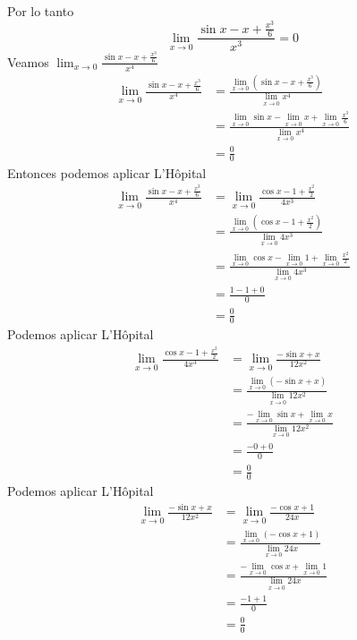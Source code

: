 \documentclass[a4paper]{article}
\begin{document}
Por lo tanto
\[
    \boxed{\boxed{ \lim_{x \to 0} \frac{\sin{x} - x + \frac{x^3}{6}}{x^3} = 0 }}
\]
Veamos \(\displaystyle \lim_{x \to 0} \frac{\sin{x} - x + \frac{x^3}{6}}{x^4}\)
\begin{align*}
    \lim_{x \to 0} \frac{\sin{x} - x + \frac{x^3}{6}}{x^4} &= \frac{\displaystyle{\lim_{x \to 0}} \left(\sin{x} - x + \frac{x^3}{6}\right)}{\displaystyle{\lim_{x \to 0}}x^4} \\
    &= \frac{\displaystyle{\lim_{x \to 0}} \sin{x} - \displaystyle{\lim_{x \to 0}} x + \displaystyle{\lim_{x \to 0}}\frac{x^3}{6}}{\displaystyle{\lim_{x \to 0}}x^4} \\
    &= \frac{0}{0}
\end{align*}
Entonces podemos aplicar L'Hôpital
\begin{align*}
    \lim_{x \to 0} \frac{\sin{x} - x + \frac{x^3}{6}}{x^4} &= \lim_{x \to 0} \frac{\cos{x} - 1 + \frac{x^2}{2}}{4x^3} \\
    &= \frac{\displaystyle{\lim_{x \to 0}} \left(\cos{x} - 1 + \frac{x^2}{2}\right)}{\displaystyle{\lim_{x \to 0}} 4x^3} \\
    &= \frac{\displaystyle{\lim_{x \to 0}} \cos{x} - \displaystyle{\lim_{x \to 0}} 1 + \displaystyle{\lim_{x \to 0}} \frac{x^2}{2}}{\displaystyle{\lim_{x \to 0}} 4x^3} \\
    &= \frac{1 - 1 + 0}{0} \\
    &= \frac{0}{0}
\end{align*}
Podemos aplicar L'Hôpital
\begin{align*}
    \lim_{x \to 0} \frac{\cos{x} - 1 + \frac{x^2}{2}}{4x^3} &= \lim_{x \to 0} \frac{-\sin{x} + x}{12x^2} \\
    &= \frac{\displaystyle{\lim_{x \to 0}} \left(-\sin{x} + x\right)}{\displaystyle{\lim_{x \to 0}} 12x^2} \\
    &= \frac{-\displaystyle{\lim_{x \to 0}} \sin{x} + \displaystyle{\lim_{x \to 0}} x}{\displaystyle{\lim_{x \to 0}} 12x^2} \\
    &= \frac{- 0 + 0}{\displaystyle{0}} \\
    &= \frac{0}{\displaystyle{0}}
\end{align*}
Podemos aplicar L'Hôpital
\begin{align*}
    \lim_{x \to 0} \frac{-\sin{x} + x}{12x^2} &= \lim_{x \to 0} \frac{-\cos{x} + 1}{24x} \\
    &= \frac{\displaystyle{\lim_{x \to 0}}\left(-\cos{x} + 1\right)}{\displaystyle{\lim_{x \to 0}} 24x} \\
    &= \frac{ - \displaystyle{\lim_{x \to 0}} \cos{x} + \displaystyle{\lim_{x \to 0}} 1}{\displaystyle{\lim_{x \to 0}} 24x} \\
    &= \frac{ - 1 + 1}{0} \\
    &= \frac{0}{0}
\end{align*}
\end{document}
